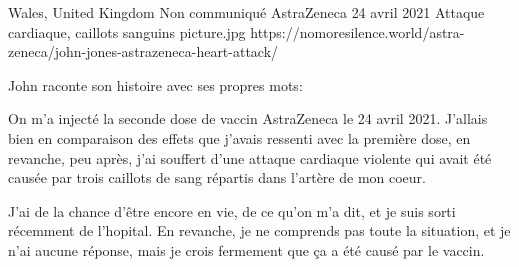 {Wales, United Kingdom}
{Non communiqué}
{AstraZeneca}
{24 avril 2021}
{Attaque cardiaque, caillots sanguins}
{picture.jpg}
{https://nomoresilence.world/astra-zeneca/john-jones-astrazeneca-heart-attack/}
{

John raconte son histoire avec ses propres mots:
  
On m'a injecté la seconde dose de vaccin AstraZeneca le 24 avril 2021. J'allais
bien en comparaison des effets que j'avais ressenti avec la première dose, en
revanche, peu après, j'ai souffert d'une attaque cardiaque violente qui avait
été causée par trois caillots de sang répartis dans l'artère de mon coeur.

J'ai de la chance d'être encore en vie, de ce qu'on m'a dit, et je suis sorti
récemment de l'hopital. En revanche, je ne comprends pas toute la situation, et
je n'ai aucune réponse, mais je crois fermement que ça a été causé par le
vaccin.

}
